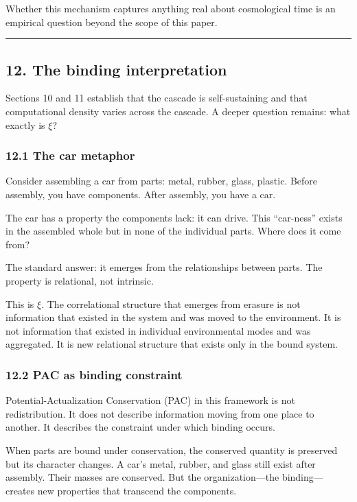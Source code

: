 \documentclass[
  11pt,
  a4paper]{article}
\begin{document}
Whether this mechanism captures anything real about cosmological time is
an empirical question beyond the scope of this paper.

\begin{center}\rule{0.5\linewidth}{0.5pt}\end{center}

\subsection{12. The binding
interpretation}\label{the-binding-interpretation}

Sections 10 and 11 establish that the cascade is self-sustaining and
that computational density varies across the cascade. A deeper question
remains: what exactly is \(\xi\)?

\subsubsection{12.1 The car metaphor}\label{the-car-metaphor}

Consider assembling a car from parts: metal, rubber, glass, plastic.
Before assembly, you have components. After assembly, you have a car.

The car has a property the components lack: it can drive. This
``car-ness'' exists in the assembled whole but in none of the individual
parts. Where does it come from?

The standard answer: it emerges from the relationships between parts.
The property is relational, not intrinsic.

This is \(\xi\). The correlational structure that emerges from erasure
is not information that existed in the system and was moved to the
environment. It is not information that existed in individual
environmental modes and was aggregated. It is new relational structure
that exists only in the bound system.

\subsubsection{12.2 PAC as binding
constraint}\label{pac-as-binding-constraint}

Potential-Actualization Conservation (PAC) in this framework is not
redistribution. It does not describe information moving from one place
to another. It describes the constraint under which binding occurs.

When parts are bound under conservation, the conserved quantity is
preserved but its character changes. A car's metal, rubber, and glass
still exist after assembly. Their masses are conserved. But the
organization---the binding---creates new properties that transcend the
components.
\end{document}
